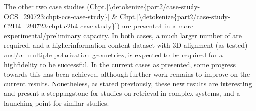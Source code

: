 \documentclass[letterpaper,table,10pt,english]{jupyterBook}
\begin{document}
\sphinxAtStartPar
The other two case studies (\hyperref[\detokenize{part2/case-study-OCS_290723:chpt-ocs-case-study}]{Chpt.\@ \ref{\detokenize{part2/case-study-OCS_290723:chpt-ocs-case-study}}} \& \hyperref[\detokenize{part2/case-study-C2H4_290723:chpt-c2h4-case-study}]{Chpt.\@ \ref{\detokenize{part2/case-study-C2H4_290723:chpt-c2h4-case-study}}}) are presented in a more experimental/preliminary capacity. In both cases, a much larger number of {\hyperref[\detokenize{backmatter/glossary:term-radial-matrix-elements}]{}} are required, and a higher\sphinxhyphen{}information content dataset with 3D alignment (as tested) and/or multiple polarization geometries, is expected to be required for a high\sphinxhyphen{}fidelity {\hyperref[\detokenize{backmatter/glossary:term-bootstrap-retrieval-protocol}]{}} to be successful. In the current cases as presented, some progress towards this has been achieved, although further work remains to improve on the current results. Nonetheless, as stated previously, these new results are interesting and present a stepping\sphinxhyphen{}stone for studies on {\hyperref[\detokenize{backmatter/glossary:term-radial-matrix-elements}]{}} retrieval in complex systems, and a launching point for similar studies.
\end{document}
